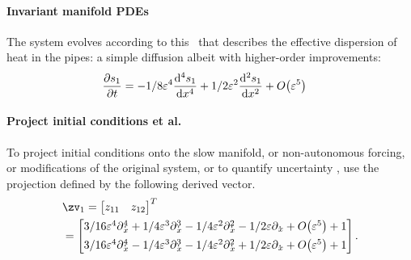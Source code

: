  
\paragraph{Invariant manifold PDEs} 
The system evolves according to this \pde\ that describes the effective dispersion of heat in the pipes: a simple diffusion albeit with higher-order improvements:
\begin{align*}&
\D t{s_{1}}={ -1/8 \eps^{4} \frac{{\rm d}^{4}s_{1}}{{\rm d}x^{4}}+1/2 \eps
^{2} \frac{{\rm d}^{2}s_{1}}{{\rm d}x^{2}}+O\big(\varepsilon ^{5}\big)
}\end{align*}



\paragraph{Project initial conditions et al.}
To project initial conditions
onto the slow manifold, or non-autonomous
forcing, or modifications of the original system, or to quantify uncertainty \cite[Ch.12]{Roberts89b, Roberts97b, Roberts2014a}, use the projection defined by the following derived vector.
\begin{align*}&
\zv_1=\begin{bmatrix}z_{11}&z_{12}\end{bmatrix}^T
\\&
=\begin{bmatrix}
{ 3/16 \eps^{4} \diff_{x}^{4}+1/4 \eps^{3} \diff_{x}^{3}-1/4 \eps^{
2} \diff_{x}^{2}-1/2 \eps \diff_{x}+O\big(\varepsilon ^{5}\big)+1
}\\[1ex]
{ 3/16 \eps^{4} \diff_{x}^{4}-1/4 \eps^{3} \diff_{x}^{3}-1/4 \eps^{
2} \diff_{x}^{2}+1/2 \eps \diff_{x}+O\big(\varepsilon ^{5}\big)+1
}
\end{bmatrix}.
\end{align*}

